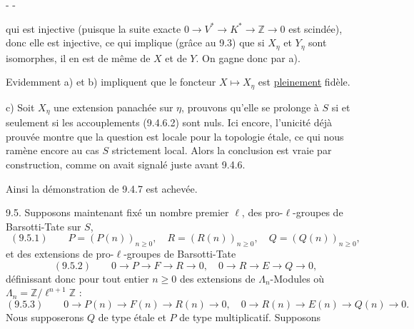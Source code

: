 \begin{center}-  -\end{center}

qui est injective (puisque la suite exacte $0\longrightarrow V^*\longrightarrow K^*\longrightarrow\mathbb Z\longrightarrow0$ est scindée), donc elle est injective, ce qui implique (grâce au  9.3) que si $X_\eta$ et $Y_\eta$ sont isomorphes, il en est de même de $X$ et de $Y$. On gagne donc par a).

Evidemment a) et b) impliquent que le foncteur $X\longmapsto X_\eta$ est \uline{pleinement} fidèle.

c) Soit $X_\eta$ une extension panachée sur $\eta$, prouvons qu'elle se prolonge à $S$ si et seulement si les accouplements (9.4.6.2) sont nuls. Ici encore, l'unicité déjà prouvée montre que la question est locale pour la topologie étale, ce qui nous ramène encore au cas $S$ strictement local. Alors la conclusion est vraie par construction, comme on avait signalé juste avant 9.4.6.

Ainsi la démonstration de 9.4.7 est achevée.

9.5. Supposons maintenant fixé un nombre premier $\ell$, des pro-$\ell$-groupes de Barsotti-Tate sur $S$,
\[
(9.5.1)\qquad P=(P(n))_{n\geq0},\quad R=(R(n))_{n\geq0},\quad Q=(Q(n))_{n\geq0},
\]
et des extensions de pro-$\ell$-groupes de Barsotti-Tate
\[
(9.5.2)\qquad 0\longrightarrow P\longrightarrow F\longrightarrow R\longrightarrow0,\quad
0\longrightarrow R\longrightarrow E\longrightarrow Q\longrightarrow0,
\]
définissant donc pour tout entier $n\geq0$ des extensions de $\Lambda_n$-Modules où $\Lambda_n=\mathbb Z/\ell^{n+1}\mathbb Z$ :
\[
(9.5.3)\qquad 0\longrightarrow P(n)\longrightarrow F(n)\longrightarrow R(n)\longrightarrow0,\quad
0\longrightarrow R(n)\longrightarrow E(n)\longrightarrow Q(n)\longrightarrow0.
\]
Nous supposerons $Q$ de type étale et $P$ de type multiplicatif. Supposons

